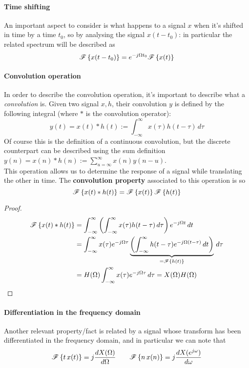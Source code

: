 	\paragraph{Time shifting} An important aspect to consider is what happens to a signal $x$ when it's shifted in time by a time $t_0$, so by analysing the signal $x(t-t_0)$: in particular the related spectrum will be described as
	\begin{equation} \label{eq:four:timeshift}
		\mathscr{F}\left\{ x(t-t_0) \right\} = e^{-j\Omega t_0} \mathscr{F}\left\{ x(t) \right\}
	\end{equation}
	
	\paragraph{Convolution operation} In order to describe the convolution operation, it's important to describe what a \textit{convolution} is. Given two signal $x,h$, their convolution $y$ is defined by the following integral (where $*$ is the convolution operator):
	\begin{equation}
		y(t) = x(t) * h(t) := \int_{-\infty}^\infty x(\tau) h(t-\tau)\, d\tau
	\end{equation}
	Of course this is the definition of a continuous convolution, but the discrete counterpart can be described using the sum definition $y(n) = x(n)*h(n) := \sum_{u=\infty}^\infty x(n) y(n-u)$. \\
	This operation allows us to determine the response of a signal while translating the other in time. The \textbf{convolution property} associated to this operation is so
	\[ \mathscr{F}\left\{ x(t) * h(t) \right\} = \mathscr{F}\left\{ x(t) \right\} \mathscr{F}\left\{ h(t) \right\} \]
		\begin{proof}
			\begin{align*}
				\mathscr{F}\left\{ x(t) * h(t) \right\} & = \int_{-\infty}^\infty \left( \int_{-\infty}^\infty x(\tau) h(t-\tau)\, d\tau \right) e^{-j\Omega t} \, dt \\
				& =  \int_{-\infty}^\infty x(\tau) e^{-j\Omega \tau} \underbrace{\left( \int_{-\infty}^\infty h(t-\tau) e^{-j\Omega(t-\tau)} \, dt \right)}_{=\mathscr{F}\left\{ h(t) \right\}} \, d\tau \\
				& = H(\Omega) \int_{-\infty}^\infty x(\tau) e^{-j\Omega \tau} \, d\tau = X(\Omega) H(\Omega)
			\end{align*}
		\end{proof}
	
	\paragraph{Differentiation in the frequency domain} Another relevant property/fact is related by a signal whose transform has been differentiated in the frequency domain, and in particular we can note that
	\begin{equation}
		\mathscr{F}\left\{ t\, x(t) \right\} = j \frac{d X(\Omega)}{d\Omega} \qquad \mathscr{F}\left\{ n \, x(n) \right\} = j \frac{dX(e^{j\omega})}{d\omega}
	\end{equation}
		
